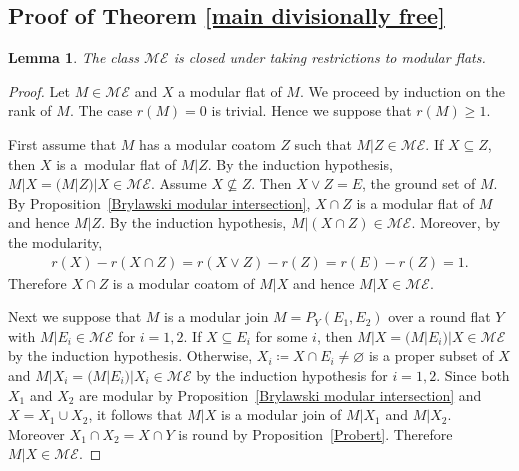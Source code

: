 \documentclass[11pt]{article}
\newtheorem{Lemma}[Theorem]{Lemma}
\begin{document}
\subsection{Proof of Theorem \ref{main divisionally free}}
\begin{Lemma}\label{restriction modular flat}
The class $ \mathcal{ME} $ is closed under taking restrictions to modular flats.
\end{Lemma}
\begin{proof}
Let $ M \in \mathcal{ME} $ and $ X $ a modular flat of $ M $.
We proceed by induction on the rank of $ M $.
The case $ r(M)=0 $ is trivial.
Hence we suppose that $ r(M) \geq 1 $.

First assume that $ M $ has a modular coatom $ Z $ such that $ M|Z \in \mathcal{ME} $.
If $ X \subseteq Z $, then $ X $ is a~modular flat of $ M|Z $.
By the induction hypothesis, $ M|X = (M|Z)|X \in \mathcal{ME} $.
Assume $ X \not\subseteq Z $.
Then $ X \vee Z = E $, the ground set of $ M $.
By Proposition~\ref{Brylawski modular intersection}, $ X \cap Z $ is a modular flat of $ M $ and hence $ M|Z $.
By the induction hypothesis, $ M|(X \cap Z) \in \mathcal{ME} $.
Moreover, by the modularity,
\begin{gather*}
r(X) - r(X \cap Z) = r(X \vee Z) - r(Z) = r(E) - r(Z) = 1.
\end{gather*}
Therefore $ X \cap Z $ is a modular coatom of $ M|X $ and hence $ M|X \in \mathcal{ME} $.

Next we suppose that $ M $ is a modular join $ M = P_{Y}(E_{1}, E_{2}) $ over a round flat $ Y $ with $ M|E_{i} \in \mathcal{ME} $ for $ i = 1,2 $.
If $ X \subseteq E_{i} $ for some $ i $, then $ M|X = (M|E_{i})|X \in \mathcal{ME} $ by the induction hypothesis.
Otherwise, $ X_{i} \coloneqq X \cap E_{i} \neq \varnothing $ is a proper subset of $ X $ and $ M|X_{i} = (M|E_{i})|X_{i} \in \mathcal{ME} $ by the induction hypothesis for $ i = 1,2 $.
Since both $ X_{1} $ and $ X_{2} $ are modular by Proposition~\ref{Brylawski modular intersection} and $ X = X_{1} \cup X_{2} $, it follows that $ M|X $ is a modular join of $ M|X_{1} $ and $ M|X_{2} $.
Moreover $ X_{1} \cap X_{2} = X \cap Y $ is round by Proposition~\ref{Probert}.
Therefore $ M|X \in \mathcal{ME} $.
\end{proof}
\end{document}
